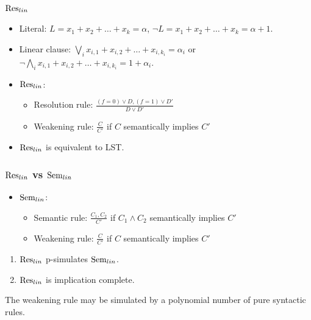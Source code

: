 \begin{frame}
    \frametitle{$\mathrm{Res}_{lin}$}

    \begin{itemize}
		\item Literal: $L = x_{1} + x_{2} + \dots + x_{k} = \alpha$,
    		$\lnot L = x_{1} + x_{2} + \dots + x_{k} = \alpha + 1$.
		\item Linear clause: $\bigvee\limits_i x_{i, 1} + x_{i, 2} + \dots + x_{i, k_i} =
		    \alpha_i$ or $\lnot \bigwedge\limits_i x_{i, 1} + x_{i, 2} + \dots + x_{i, k_i} =
            1 + \alpha_i$.
        \pause
		\item $\mathrm{Res}_{lin}$:
			\begin{itemize}
				\item Resolution rule: $\frac{(f = 0) \lor D, (f = 1) \lor D'}
            		{D \lor D'}$ 
				\item Weakening rule: $\frac{C}{C'}$ if $C$ semantically implies $C'$
			\end{itemize}
        \pause
		\item {} $\mathrm{Res}_{lin}$ is equivalent to LST.
	\end{itemize}
	\scalebox{0.8}{}
\end{frame}



\begin{frame}
    \frametitle{$\mathrm{Res}_{lin}$ vs $\mathrm{Sem}_{lin}$}

    \begin{itemize}
		\item $\mathrm{Sem}_{lin}$:
			\begin{itemize}
				\item Semantic rule: $\frac{C_1, C_2}{C'}$ if $C_1 \land C_2$
		            semantically implies $C'$
				\item Weakening rule: $\frac{C}{C'}$ if $C$ semantically implies $C'$
			\end{itemize}
	\end{itemize}

	\pause
    \begin{theorem}
        \begin{enumerate}
            \item $\mathrm{Res}_{lin}$ p-simulates $\mathrm{Sem}_{lin}$.
        	\pause
        	\item $\mathrm{Res}_{lin}$ is implication complete.
        \end{enumerate}
    \end{theorem}

    \pause

    The weakening rule may be simulated by a polynomial number of pure syntactic rules.
\end{frame}



